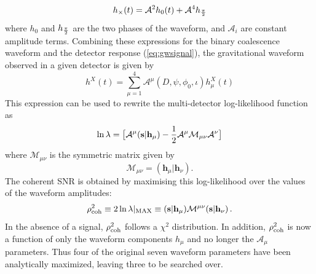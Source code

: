 \documentclass[binding=0.6cm, LaM]{sapthesis}
\begin{document}
        \begin{equation}
          h_{\times}(t) = \mathcal{A}^2h_0(t) + \mathcal{A}^4h_{{{\pi} \over {2}}}
        \end{equation}
 	where $h_0$ and $h_{{{\pi} \over {2}}}$ are the two phases of the waveform,
	and $\mathcal{A}_i$ are constant amplitude terms.
	Combining these expressions for the binary coalescence waveform 
	and the detector response (\ref{eq:gwsignal}),
	the gravitational waveform observed in a given detector is given by
        \begin{equation}
          h^X(t) = \sum_{\mu=1}^4\mathcal{A}^{\mu}(D,\psi,\phi_0,\iota)h_{\mu}^X(t)
        \end{equation}
	This expression can be used to rewrite the multi-detector log-likelihood function as 
        \begin{equation}
          \ln\lambda = \big[  \mathcal{A}^{\mu}(\textbf{s}|\textbf{h}_{\mu}) - {{1}\over{2}}\mathcal{A}^{\mu}\mathcal{M}_{\mu\nu}\mathcal{A}^{\nu} \big]
        \end{equation}
        where $\mathcal{M}_{\mu\nu}$ is the symmetric matrix given by
        \begin{equation}
          \mathcal{M}_{\mu\nu}  = (\textbf{h}_{\mu}|\textbf{h}_{\nu}).
        \end{equation}
	The coherent SNR is obtained by maximising this log-likelihood 
	over the values of the waveform amplitudes:
        \begin{equation}
          \rho^2_{\rm coh}\equiv 2 \ln \lambda |_{\rm MAX}\equiv (\textbf{s}|\textbf{h}_{\mu})\mathcal{M}^{\mu\nu}(\textbf{s}|\textbf{h}_{\nu})\,.
        \end{equation}
	In the absence of a signal, $\rho^2_{\rm coh}$ follows a $\chi^2$ distribution.
	In addition, $\rho^2_{\rm coh}$ is now a function of only the waveform components $h_{\mu}$ 
	and no longer the $\mathcal{A}_{\mu}$ parameters. 
	Thus four of the original seven waveform parameters have been analytically maximized, leaving three to be searched over.
\end{document}
